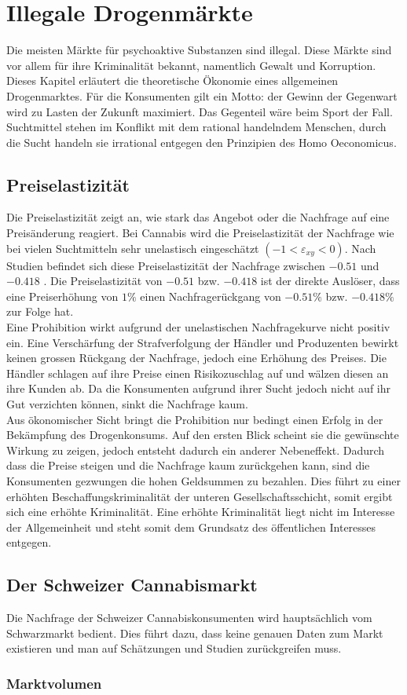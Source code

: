 \documentclass[../main.tex]{subfiles}
\begin{document}
 	\section{Illegale Drogenmärkte}
	 Die meisten Märkte für psychoaktive Substanzen sind illegal.
	 Diese Märkte sind vor allem für ihre Kriminalität bekannt, namentlich Gewalt und Korruption. 
	 Dieses Kapitel erläutert die theoretische Ökonomie eines allgemeinen Drogenmarktes.
	 Für die Konsumenten gilt ein Motto: der Gewinn der Gegenwart wird zu Lasten der Zukunft maximiert. 
	 Das Gegenteil wäre beim Sport der Fall. Suchtmittel stehen im Konflikt mit dem rational handelndem Menschen, 
	 durch die Sucht handeln sie irrational entgegen den Prinzipien des Homo Oeconomicus.

	\subsection{Preiselastizität}
	Die Preiselastizität zeigt an, wie stark das Angebot oder die Nachfrage auf eine Preisänderung reagiert.
	Bei Cannabis wird die Preiselastizität der Nachfrage wie bei vielen Suchtmitteln sehr unelastisch eingeschätzt $(-1<\varepsilon_{xy}<0)$. 
	Nach Studien befindet sich diese Preiselastizität der Nachfrage zwischen $-0.51$ \cite{golzar} und $-0.418$ \cite{halcoussis}.
	Die Preiselastizität von $-0.51$ bzw. $-0.418$ ist der direkte Auslöser, dass eine Preiserhöhung von $1\%$ einen Nachfragerückgang von $-0.51\%$ bzw. $-0.418\%$ zur Folge hat.\\
	
	\noindent
	Eine Prohibition wirkt aufgrund der unelastischen Nachfragekurve nicht positiv ein.
	Eine Verschärfung der Strafverfolgung der Händler und Produzenten bewirkt keinen grossen Rückgang der Nachfrage, jedoch eine Erhöhung des Preises.
	Die Händler schlagen auf ihre Preise einen Risikozuschlag auf und wälzen diesen an ihre Kunden ab.
	Da die Konsumenten aufgrund ihrer Sucht jedoch nicht auf ihr Gut verzichten können, sinkt die Nachfrage kaum. \\
	
	\noindent
	Aus ökonomischer Sicht bringt die Prohibition nur bedingt einen Erfolg in der Bekämpfung des Drogenkonsums. 
	Auf den ersten Blick scheint sie die gewünschte Wirkung zu zeigen, jedoch entsteht dadurch ein anderer Nebeneffekt. 
	Dadurch dass die Preise steigen und die Nachfrage kaum zurückgehen kann, sind die Konsumenten gezwungen die hohen Geldsummen zu bezahlen. 
	Dies führt zu einer erhöhten Beschaffungskriminalität der unteren Gesellschaftsschicht, somit ergibt sich eine erhöhte Kriminalität. 
	Eine erhöhte Kriminalität liegt nicht im Interesse der Allgemeinheit und steht somit dem Grundsatz des öffentlichen Interesses entgegen.
	
	\subsection{Der Schweizer Cannabismarkt}
	Die Nachfrage der Schweizer Cannabiskonsumenten wird hauptsächlich vom Schwarzmarkt bedient. 
	Dies führt dazu, dass keine genauen Daten zum Markt existieren und man auf Schätzungen und Studien zurückgreifen muss.
	
	\subsubsection{Marktvolumen}
	
\end{document}
